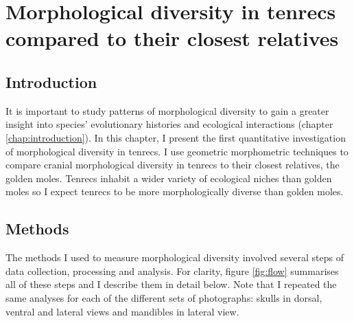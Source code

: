 \chapter{Morphological diversity in tenrecs compared to their closest relatives}
\label{chap:disparity}


\section{Introduction}


	It is important to study patterns of morphological diversity to gain a greater insight into species' evolutionary histories and ecological interactions (chapter \ref{chap:introduction}). In this chapter, I present the first quantitative investigation of morphological diversity in tenrecs. I use geometric morphometric techniques \citep{Rohlf1993} to compare cranial morphological diversity in tenrecs to their closest relatives, the golden moles. Tenrecs inhabit a wider variety of ecological niches than golden moles \citep{Soarimalala2011, Bronner1995} so I expect tenrecs to be more morphologically diverse than golden moles. 
	
	

\section{Methods}

	The methods I used to measure morphological diversity involved several steps of data collection, processing and analysis. For clarity,  figure \ref{fig:flow} summarises all of these steps and I describe them in detail below. Note that I repeated the same analyses for each of the different sets of photographs: skulls in dorsal, ventral and lateral views and mandibles in lateral view.
	
